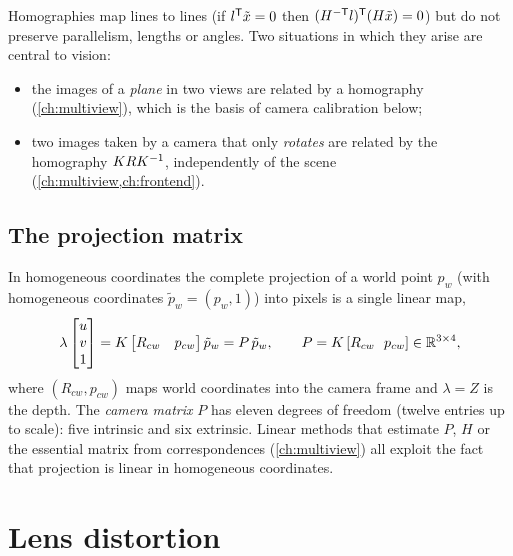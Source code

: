 Homographies map lines to lines (if $l^{\mathsf{T}}\tilde x = 0$ then $(H^{-\mathsf{T}} l)^{\mathsf{T}}(H\tilde x) = 0$) but do not preserve parallelism, lengths or angles. Two situations in
which they arise are central to vision:
\begin{itemize}
  \item the images of a \emph{plane} in two views are related by a homography (\cref{ch:multiview}), which is the basis of camera calibration below;
  \item two images taken by a camera that only \emph{rotates} are related by the homography $KRK^{-1}$, independently of the scene (\cref{ch:multiview,ch:frontend}).
\end{itemize}

\subsection{The projection matrix}

In homogeneous coordinates the complete projection of a world point $p_w$ (with homogeneous coordinates $\tilde p_w = (p_w, 1)$) into pixels is a single linear map,
\begin{equation}
  \lambda\begin{bmatrix} u \\ v \\ 1\end{bmatrix} = K\begin{bmatrix} R_{cw} & p_{cw}\end{bmatrix}\tilde p_w = P\,\tilde p_w,
  \qquad P = K\,[R_{cw}\ \ p_{cw}] \in \mathbb{R}^{3\times4},
\end{equation}
where $(R_{cw}, p_{cw})$ maps world coordinates into the camera frame and $\lambda = Z$ is the depth. The \emph{camera matrix} $P$ has eleven degrees of freedom (twelve
entries up to scale): five intrinsic and six extrinsic. Linear methods that estimate $P$, $H$ or the essential matrix from correspondences
(\cref{ch:multiview}) all exploit the fact that projection is linear in homogeneous coordinates.

\section{Lens distortion}
\label{sec:distortion}

